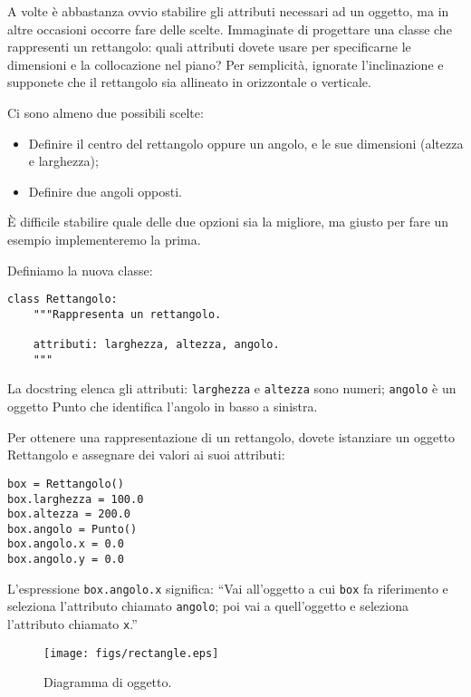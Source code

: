 \documentclass[10pt]{book}
\begin{document}
A volte è abbastanza ovvio stabilire gli attributi necessari ad un oggetto, ma in altre occasioni occorre fare delle scelte. Immaginate di progettare una classe che rappresenti un rettangolo: quali attributi dovete usare per specificarne le dimensioni e la collocazione nel piano? Per semplicità, ignorate l'inclinazione e supponete che il rettangolo sia allineato in orizzontale o verticale.

Ci sono almeno due possibili scelte: 

\begin{itemize}

\item Definire il centro del rettangolo oppure un angolo, e le sue dimensioni (altezza e larghezza);

\item Definire due angoli opposti.

\end{itemize}

È difficile stabilire quale delle due opzioni sia la migliore, ma giusto per fare un esempio implementeremo la prima.

Definiamo la nuova classe:

\begin{verbatim}
class Rettangolo:
    """Rappresenta un rettangolo. 

    attributi: larghezza, altezza, angolo.
    """
\end{verbatim}
%
La docstring elenca gli attributi:  {\tt larghezza} e
{\tt altezza} sono numeri; {\tt angolo} è un oggetto Punto che identifica l'angolo in basso a sinistra.

Per ottenere una rappresentazione di un rettangolo, dovete istanziare un oggetto Rettangolo e assegnare dei valori ai suoi attributi:

\begin{verbatim}
box = Rettangolo()
box.larghezza = 100.0
box.altezza = 200.0
box.angolo = Punto()
box.angolo.x = 0.0
box.angolo.y = 0.0
\end{verbatim}
%
L'espressione {\tt box.angolo.x} significa:
``Vai all'oggetto a cui {\tt box} fa riferimento e seleziona l'attributo chiamato
{\tt angolo}; poi vai a quell'oggetto e seleziona l'attributo chiamato {\tt x}.''

\begin{figure}
\centerline
{\texttt{[image: figs/rectangle.eps]}}
\caption{Diagramma di oggetto.}
\label{fig.rectangle}
\end{figure}
\end{document}
